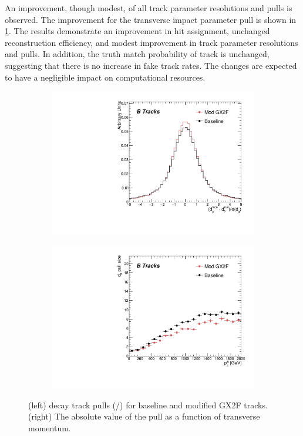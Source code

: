 An improvement, though modest, of all track parameter resolutions and pulls is observed.
The improvement for the transverse impact parameter pull is shown in \cref{fig:gx2f_opt_pulls}.
The results demonstrate an improvement in hit assignment, unchanged reconstruction efficiency, and modest improvement in track parameter resolutions and pulls. In addition, the truth match probability of track is unchanged, suggesting that there is no increase in fake track rates. The changes are expected to have a negligible impact on computational resources.

\begin{figure}[!htbp]
    \centering
    \begin{subfigure}{.48\textwidth}
      \centering
      \includegraphics[width=\textwidth]{chapters/3.tracking/figs/h_recoTruthPull_d0_From_B.pdf}
    \end{subfigure}%
    \begin{subfigure}{.48\textwidth}
      \centering
      \includegraphics[width=\textwidth]{chapters/3.tracking/figs/p_d0_pull_size_pTB_From_B.pdf}
    \end{subfigure}
    \caption{(left) \bhadron decay track \dzero pulls (\dzero/\dzerosig) for baseline and modified GX2F tracks. (right) The absolute value of the \dzero pull as a function of \bhadron transverse momentum.}
    \label{fig:gx2f_opt_pulls}
\end{figure}




